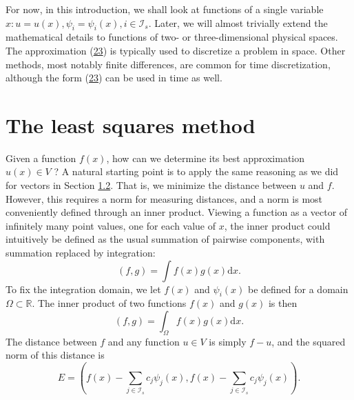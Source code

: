 \documentclass[../main.tex]{subfiles}
\begin{document}
For now, in this introduction, we shall look at functions of a single variable $x: u=u(x), \psi_{i}=\psi_{i}(x), i \in \mathcal{I}_{s}$. Later, we will almost trivially extend the mathematical details to functions of two- or three-dimensional physical spaces.
The approximation (\hyperref[eqa23]{23}) is typically used to discretize a problem in space. Other
methods, most notably finite differences, are common for time discretization,
although the form (\hyperref[eqa23]{23}) can be used in time as well.
\section[The least squares method]{The least squares method}
\label{sec:sec_2_1}

\noindent Given a function $f(x)$, how can we determine its best approximation $u(x) \in V$ ? A natural starting point is to apply the same reasoning as we did for vectors in Section \hyperref[sec:sec_1_2]{1.2}. That is, we minimize the distance between $u$ and $f$. However, this requires a norm for measuring distances, and a norm is most conveniently defined through an inner product. Viewing a function as a vector of infinitely many point values, one for each value of $x$, the inner product could intuitively be defined as the usual summation of pairwise components, with summation replaced by integration:
$$
(f, g)=\int f(x) g(x) \mathrm{d} x.
$$
To fix the integration domain, we let $f(x)$ and $\psi_{i}(x)$ be defined for a domain $\Omega \subset \mathbb{R}$. The inner product of two functions $f(x)$ and $g(x)$ is then
\begin{equation}\label{eqa24}
(f, g)=\int_{\Omega} f(x) g(x) \mathrm{d} x.	
\end{equation}
The distance between $f$ and any function $u \in V$ is simply $f-u$, and the squared norm of this distance is
\begin{equation}\label{eqa25}
E=\left(f(x)-\sum_{j \in \mathcal{I}_{s}} c_{j} \psi_{j}(x), f(x)-\sum_{j \in \mathcal{I}_{s}} c_{j} \psi_{j}(x)\right).	
\end{equation}
\end{document}
